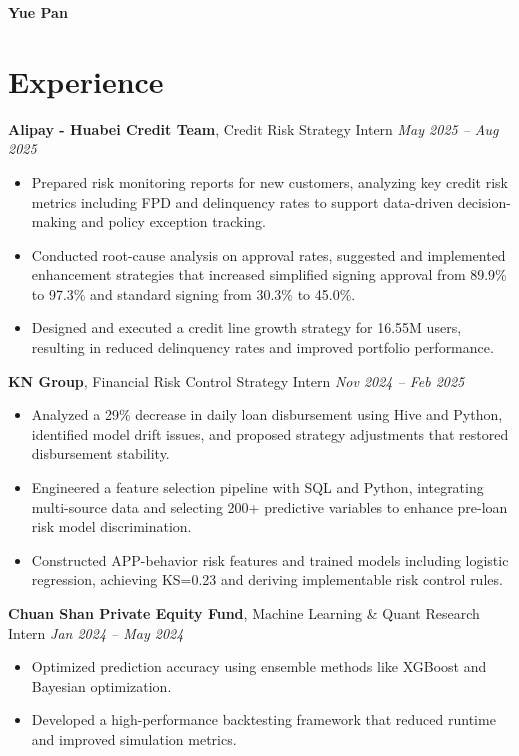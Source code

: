 \documentclass[11pt,letterpaper]{article}
\begin{document}
\begin{center}
    {\fontsize{26}{28}\selectfont \textbf{Yue Pan}} \\
    \vspace{2pt}
    
\end{center}



\section{Experience}

\textbf{Alipay - Huabei Credit Team}, Credit Risk Strategy Intern
\emph{May 2025 – Aug 2025}
\begin{itemize}[leftmargin=*, topsep=0pt, itemsep=1pt]
\item Prepared risk monitoring reports for new customers, analyzing key credit risk metrics including FPD and delinquency rates to support data-driven decision-making and policy exception tracking.
\item Conducted root-cause analysis on approval rates, suggested and implemented enhancement strategies that increased simplified signing approval from 89.9\% to 97.3\% and standard signing from 30.3\% to 45.0\%.
\item Designed and executed a credit line growth strategy for 16.55M users, resulting in reduced delinquency rates and improved portfolio performance.
\end{itemize}

\textbf{KN Group}, Financial Risk Control Strategy Intern
\emph{Nov 2024 – Feb 2025}
\begin{itemize}[leftmargin=*, topsep=0pt, itemsep=1pt]
\item Analyzed a 29\% decrease in daily loan disbursement using Hive and Python, identified model drift issues, and proposed strategy adjustments that restored disbursement stability.
\item Engineered a feature selection pipeline with SQL and Python, integrating multi-source data and selecting 200+ predictive variables to enhance pre-loan risk model discrimination.
\item Constructed APP-behavior risk features and trained models including logistic regression, achieving KS=0.23 and deriving implementable risk control rules.
\end{itemize}

\textbf{Chuan Shan Private Equity Fund}, Machine Learning \& Quant Research Intern
\emph{Jan 2024 – May 2024}
\begin{itemize}[leftmargin=*, topsep=0pt, itemsep=1pt]
\item Optimized prediction accuracy using ensemble methods like XGBoost and Bayesian optimization.
\item Developed a high-performance backtesting framework that reduced runtime and improved simulation metrics.
\end{itemize}
\end{document}
